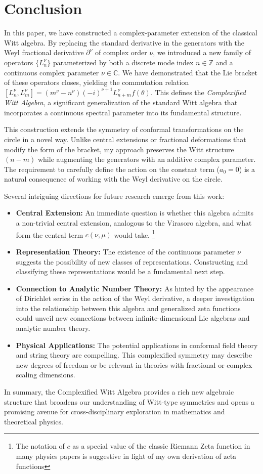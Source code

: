 \documentclass{artjltcopy}
\newcommand{\?}{\textbackslash}
\begin{document}
\section{Conclusion}
In this paper, we have constructed a complex-parameter extension of the classical Witt algebra. By replacing the standard derivative in the generators with the Weyl fractional derivative $\partial^\nu$ of complex order $\nu$, we introduced a new family of operators $\{L^\nu_n\}$ parameterized by both a discrete mode index $n \in \mathbb{Z}$ and a continuous complex parameter $\nu \in \mathbb{C}$. We have demonstrated that the Lie bracket of these operators closes, yielding the commutation relation
$[L^\nu_n,L^\nu_m]=(m^{\nu} - n^\nu )(-i)^{\nu+1} L^{\nu}_{n+m} f(\theta)$.
This defines the \emph{Complexified Witt Algebra}, a significant generalization of the standard Witt algebra that incorporates a continuous spectral parameter into its fundamental structure.

This construction extends the symmetry of conformal transformations on the circle in a novel way. Unlike central extensions or fractional deformations that modify the form of the bracket, my approach preserves the Witt structure $(n-m)$ while augmenting the generators with an additive complex parameter. The requirement to carefully define the action on the constant term ($a_0 = 0$) is a natural consequence of working with the Weyl derivative on the circle.

Several intriguing directions for future research emerge from this work:
\begin{itemize}
    \item \textbf{Central Extension:} An immediate question is whether this algebra admits a non-trivial central extension, analogous to the Virasoro algebra, and what form the central term $c(\nu, \mu)$ would take. \footnote{The notation of $c$ as a special value of the classic Riemann Zeta function in many physics papers is suggestive in light of my own derivation of zeta functions}
    \item \textbf{Representation Theory:} The existence of the continuous parameter $\nu$ suggests the possibility of new classes of representations. Constructing and classifying these representations would be a fundamental next step.
    \item \textbf{Connection to Analytic Number Theory:} As hinted by the appearance of Dirichlet series in the action of the Weyl derivative, a deeper investigation into the relationship between this algebra and generalized zeta functions could unveil new connections between infinite-dimensional Lie algebras and analytic number theory.
    \item \textbf{Physical Applications:} The potential applications in conformal field theory and string theory are compelling. This complexified symmetry may describe new degrees of freedom or be relevant in theories with fractional or complex scaling dimensions.
\end{itemize}
In summary, the Complexified Witt Algebra provides a rich new algebraic structure that broadens our understanding of Witt-type symmetries and opens a promising avenue for cross-disciplinary exploration in mathematics and theoretical physics.
\end{document}

